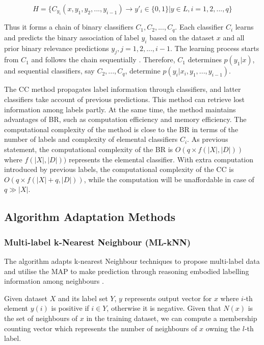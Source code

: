 \begin{equation}\label{eq:ClassifierChains}
H = \{C_{y_{i}}(x, y_{1},y_{2},...,y_{i-1}) \to y'_{i} \in \{0,1\}| y \in L, i = 1,2,...,q\}
\end{equation}

Thus it forms a chain of binary classifiers $C_{1},C_{2},...,C_{q}$. Each classifier $C_{i}$ learns and predicts the binary association of label $y_{i}$ based on the dataset $x$ and all prior binary relevance predictions $y_{j}, j = 1,2,...,i-1$. The learning process starts from $C_{1}$ and follows the chain sequentially . Therefore, $C_{1}$ determines $p(y_{1}|x)$, and sequential classifiers, say $C_{2},...,C_{q}$, determine $p(y_{i}|x_{i},y_{1},...,y_{i-1})$.

The CC method propagates label information through classifiers, and latter classifiers take account of previous predictions. This method can retrieve lost information among labels partly. At the same time, the method maintains advantages of BR, such as computation efficiency and memory efficiency. The computational complexity of the method is close to the BR in terms of the number of labels and complexity of elemental classifiers $C_{i}$. As previous statement, the computational complexity of the BR is $O(q \times f(|X|,|D|))$ where $f(|X|,|D|))$ represents the elemental classifier. With extra computation introduced by previous labels, the computational complexity of the CC is $O(q \times f(|X|+q,|D|))$, while the computation will be unaffordable in case of $q \gg |X|$.

\subsection{Algorithm Adaptation Methods}

\subsubsection{Multi-label k-Nearest Neighbour (ML-kNN)}

The algorithm adapts k-nearest Neighbour techniques to propose multi-label data and utilise the MAP to make prediction through reasoning embodied labelling information among neighbours \citep{zhang2007ml}.

Given dataset $X$ and its label set $Y$, $y$ represents output vector for $x$ where $i$-th element $y(i)$ is positive if $i \in Y$, otherwise it is negative. Given that $N(x)$ is the set of neighbours of $x$ in the training dataset, we can compute a membership counting vector which represents the number of neighbours of $x$ owning the $l$-th label.

